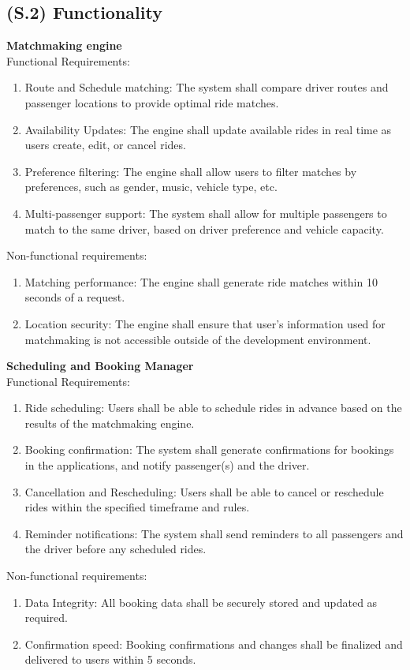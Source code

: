 \documentclass[12pt,letterpaper]{article}
\begin{document}
\subsection{(S.2) Functionality}
\textbf{Matchmaking engine} \\
\noindent Functional Requirements:
\begin{enumerate}
  \item Route and Schedule matching: The system shall compare driver routes and passenger locations to provide optimal ride matches.
  \item Availability Updates: The engine shall update available rides in real time as users create, edit, or cancel rides.
  \item Preference filtering: The engine shall allow users to filter matches by preferences, such as gender, music, vehicle type, etc.
  \item Multi-passenger support: The system shall allow for multiple passengers to match to the same driver, based on driver preference and vehicle capacity.
\end{enumerate}
Non-functional requirements:
\begin{enumerate}
  \item Matching performance: The engine shall generate ride matches within 10 seconds of a request.
  \item Location security: The engine shall ensure that user’s information used for matchmaking is not accessible outside of the development environment.
\end{enumerate}
\vspace{1em}
\noindent \textbf{Scheduling and Booking Manager} \\ 
Functional Requirements:
\begin{enumerate}
  \item Ride scheduling: Users shall be able to schedule rides in advance based on the results of the matchmaking engine.
  \item Booking confirmation: The system shall generate confirmations for bookings in the applications, and notify passenger(s) and the driver.
  \item Cancellation and Rescheduling: Users shall be able to cancel or reschedule rides within the specified timeframe and rules.
  \item Reminder notifications: The system shall send reminders to all passengers and the driver before any scheduled rides.
\end{enumerate} 
Non-functional requirements:
\begin{enumerate}
  \item Data Integrity: All booking data shall be securely stored and updated as required.
  \item Confirmation speed: Booking confirmations and changes shall be finalized and delivered to users within 5 seconds.
\end{enumerate}
\end{document}
